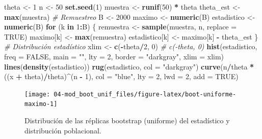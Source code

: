 \documentclass[]{book}
\newenvironment{Shaded}{\begin{snugshade}}{\end{snugshade}}
\newcommand{\KeywordTok}[1]{\textcolor[rgb]{0.13,0.29,0.53}{\textbf{#1}}}
\newcommand{\DataTypeTok}[1]{\textcolor[rgb]{0.13,0.29,0.53}{#1}}
\newcommand{\DecValTok}[1]{\textcolor[rgb]{0.00,0.00,0.81}{#1}}
\newcommand{\StringTok}[1]{\textcolor[rgb]{0.31,0.60,0.02}{#1}}
\newcommand{\CommentTok}[1]{\textcolor[rgb]{0.56,0.35,0.01}{\textit{#1}}}
\newcommand{\OtherTok}[1]{\textcolor[rgb]{0.56,0.35,0.01}{#1}}
\newcommand{\ControlFlowTok}[1]{\textcolor[rgb]{0.13,0.29,0.53}{\textbf{#1}}}
\newcommand{\OperatorTok}[1]{\textcolor[rgb]{0.81,0.36,0.00}{\textbf{#1}}}
\newcommand{\NormalTok}[1]{#1}
\theoremstyle{definition}
\theoremstyle{definition}
\theoremstyle{definition}
\theoremstyle{remark}
\begin{document}
\begin{Shaded}
\begin{Highlighting}[]
\NormalTok{theta <-}\StringTok{ }\DecValTok{1}
\NormalTok{n <-}\StringTok{ }\DecValTok{50}
\KeywordTok{set.seed}\NormalTok{(}\DecValTok{1}\NormalTok{)}
\NormalTok{muestra <-}\StringTok{ }\KeywordTok{runif}\NormalTok{(}\DecValTok{50}\NormalTok{) }\OperatorTok{*}\StringTok{ }\NormalTok{theta}
\NormalTok{theta_est <-}\StringTok{ }\KeywordTok{max}\NormalTok{(muestra)}
\CommentTok{# Remuestreo}
\NormalTok{B <-}\StringTok{ }\DecValTok{2000}
\NormalTok{maximo <-}\StringTok{ }\KeywordTok{numeric}\NormalTok{(B)}
\NormalTok{estadistico <-}\StringTok{ }\KeywordTok{numeric}\NormalTok{(B)}
\ControlFlowTok{for}\NormalTok{ (k }\ControlFlowTok{in} \DecValTok{1}\OperatorTok{:}\NormalTok{B) \{}
\NormalTok{    remuestra <-}\StringTok{ }\KeywordTok{sample}\NormalTok{(muestra, n, }\DataTypeTok{replace =} \OtherTok{TRUE}\NormalTok{)}
\NormalTok{    maximo[k] <-}\StringTok{ }\KeywordTok{max}\NormalTok{(remuestra)}
\NormalTok{    estadistico[k] <-}\StringTok{ }\NormalTok{maximo[k] }\OperatorTok{-}\StringTok{ }\NormalTok{theta_est}
\NormalTok{\}}
\CommentTok{# Distribución estadístico}
\NormalTok{xlim <-}\StringTok{ }\KeywordTok{c}\NormalTok{(}\OperatorTok{-}\NormalTok{theta}\OperatorTok{/}\DecValTok{2}\NormalTok{, }\DecValTok{0}\NormalTok{) }\CommentTok{# c(-theta, 0)}
\KeywordTok{hist}\NormalTok{(estadistico, }\DataTypeTok{freq =} \OtherTok{FALSE}\NormalTok{, }\DataTypeTok{main =} \StringTok{""}\NormalTok{, }\DataTypeTok{lty =} \DecValTok{2}\NormalTok{, }
     \DataTypeTok{border =} \StringTok{"darkgray"}\NormalTok{, }\DataTypeTok{xlim =}\NormalTok{ xlim)}
\KeywordTok{lines}\NormalTok{(}\KeywordTok{density}\NormalTok{(estadistico))}
\KeywordTok{rug}\NormalTok{(estadistico, }\DataTypeTok{col =} \StringTok{"darkgray"}\NormalTok{)}
\KeywordTok{curve}\NormalTok{(n}\OperatorTok{/}\NormalTok{theta }\OperatorTok{*}\StringTok{ }\NormalTok{((x }\OperatorTok{+}\StringTok{ }\NormalTok{theta)}\OperatorTok{/}\NormalTok{theta)}\OperatorTok{^}\NormalTok{(n }\OperatorTok{-}\StringTok{ }\DecValTok{1}\NormalTok{), }\DataTypeTok{col =} \StringTok{"blue"}\NormalTok{, }\DataTypeTok{lty =} \DecValTok{2}\NormalTok{, }\DataTypeTok{lwd =} \DecValTok{2}\NormalTok{, }\DataTypeTok{add =} \OtherTok{TRUE}\NormalTok{)}
\end{Highlighting}
\end{Shaded}

\begin{figure}[!htb]

{\centering \texttt{[image: 04-mod\_boot\_unif\_files/figure-latex/boot-uniforme-maximo-1]} 

}

\caption{Distribución de las réplicas bootstrap (uniforme) del estadístico y distribución poblacional.}\label{fig:boot-uniforme-maximo}
\end{figure}
\end{document}
